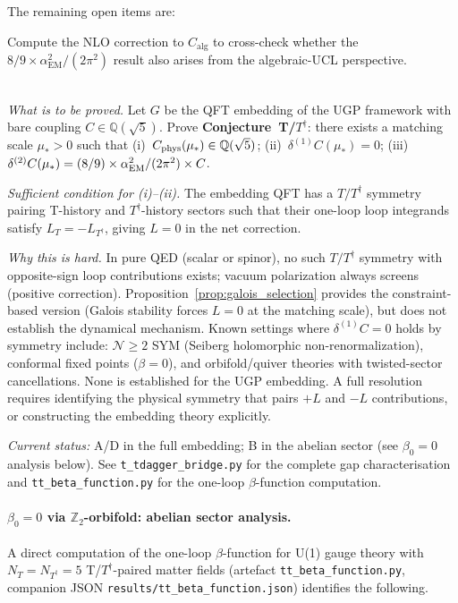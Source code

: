 \documentclass[11pt]{article}
\theoremstyle{remark}
\newcommand{\Calg}{C_{\mathrm{alg}}}
\begin{document}
The remaining open items are:
\begin{description}[leftmargin=2em,itemsep=0.1em]
  \item[\textbf{O1}: Next-to-leading UCL.] Compute the NLO correction to $\Calg$
    to cross-check whether the $8/9 \times \alpha_{\mathrm{EM}}^2/(2\pi^2)$ result
    also arises from the algebraic-UCL perspective.
  \item[\textbf{O2}: One-loop effective action (Open Problem).] \hfill \\
    \textit{What is to be proved.}
    Let $G$ be the QFT embedding of the UGP framework with bare coupling
    $C \in \mathbb{Q}(\sqrt{5})$.  Prove \textbf{Conjecture~T/$T^\dagger$}: there
    exists a matching scale $\mu_* > 0$ such that
    (i)~$C_{\rm phys}(\mu_*) \in \mathbb{Q}(\sqrt{5})$;
    (ii)~$\delta^{(1)} C(\mu_*) = 0$;
    (iii)~$\delta^{(2)} C(\mu_*) = (8/9) \times \alpha_{\rm EM}^2/(2\pi^2) \times C$.

    \textit{Sufficient condition for (i)--(ii).}
    The embedding QFT has a $T/T^\dagger$ symmetry pairing T-history and
    $T^\dagger$-history sectors such that their one-loop loop integrands satisfy
    $L_T = -L_{T^\dagger}$, giving $L = 0$ in the net correction.

    \textit{Why this is hard.}
    In pure QED (scalar or spinor), no such $T/T^\dagger$ symmetry with opposite-sign
    loop contributions exists; vacuum polarization always screens (positive correction).
    Proposition~\ref{prop:galois_selection} provides the constraint-based version
    (Galois stability forces $L = 0$ at the matching scale), but does not establish
    the dynamical mechanism.  Known settings where $\delta^{(1)}C = 0$ holds by
    symmetry include: $\mathcal{N} \geq 2$ SYM (Seiberg holomorphic non-renormalization),
    conformal fixed points ($\beta = 0$), and orbifold/quiver theories with
    twisted-sector cancellations.  None is established for the UGP embedding.
    A full resolution requires identifying the physical symmetry that pairs
    $+L$ and $-L$ contributions, or constructing the embedding theory explicitly.

    \textit{Current status:} A/D in the full embedding; B in the abelian
    sector (see $\beta_0 = 0$ analysis below).
    See \texttt{t\_tdagger\_bridge.py} for the complete gap characterisation
    and \texttt{tt\_beta\_function.py} for the one-loop $\beta$-function
    computation.
\end{description}

\paragraph{$\beta_0 = 0$ via $\mathbb{Z}_2$-orbifold: abelian sector analysis.}
\label{para:beta_zero_orbifold}
A direct computation of the one-loop $\beta$-function for U(1) gauge theory
with $N_T = N_{T^\dagger} = 5$ T/$T^\dagger$-paired matter fields
(artefact \texttt{tt\_beta\_function.py}, companion JSON
\texttt{results/tt\_beta\_function.json}) identifies the following.
\end{document}
